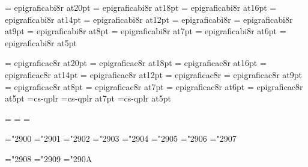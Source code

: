 \font\twentyslbf=      epigraficabi8r at20pt
\font\eighteenslbf=    epigraficabi8r at18pt
\font\sixteenslbf=     epigraficabi8r at16pt
\font\fourteenslbf=    epigraficabi8r at14pt
\font\twelveslbf=      epigraficabi8r at12pt
\font\slbf=            epigraficabi8r
\font\nineslbf=        epigraficabi8r at9pt
\font\eightslbf=       epigraficabi8r at8pt
\font\sevenslbf=       epigraficabi8r at7pt
\font\sixslbf=         epigraficabi8r at6pt
\font\fiveslbf=        epigraficabi8r at5pt

\font\twentycaps=      epigraficac8r at20pt
\font\eighteencaps=    epigraficac8r at18pt
\font\sixteencaps=     epigraficac8r at16pt
\font\fourteencaps=    epigraficac8r at14pt
\font\twelvecaps=      epigraficac8r at12pt
\font\caps=            epigraficac8r
\font\ninecaps=        epigraficac8r at9pt
\font\eightcaps=       epigraficac8r at8pt
\font\sevencaps=       epigraficac8r at7pt
\font\sixcaps=         epigraficac8r at6pt
\font\fivecaps=        epigraficac8r at5pt
%
%
\font\tenepi=cs-qplr
\font\sevenepi=cs-qplr at7pt
\font\fiveepi=cs-qplr at5pt

=\tenepi
{}=\sevenepi
{}=\fiveepi
\def\missepi{\fam=9}

\mathchardef\Gamma="2900
\mathchardef\Delta="2901
\mathchardef\Theta="2902
\mathchardef\Lambda="2903
\mathchardef\Xi="2904
\mathchardef\Pi="2905
\mathchardef\Sigma="2906
\mathchardef\Upsilon="2907

\mathchardef\Phi="2908
\mathchardef\Psi="2909
\mathchardef\Omega="290A

%
\rm 